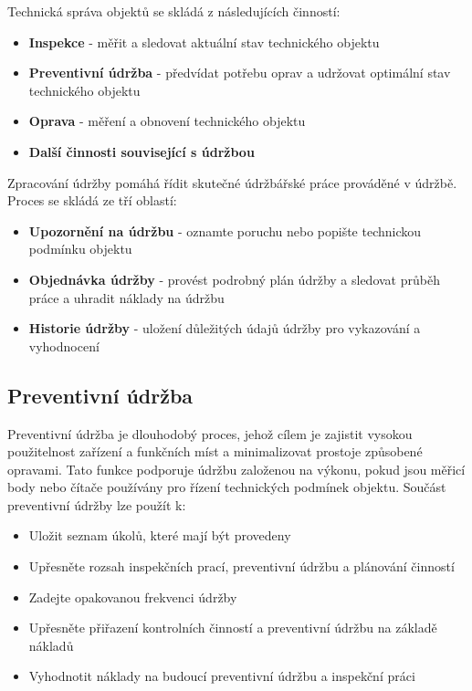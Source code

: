 \documentclass[thesis=M,czech]{FITthesis}[2012/06/26]
\begin{document}
Technická správa objektů se skládá z následujících činností:
\begin{itemize}
	\item
	\textbf{Inspekce} - měřit a sledovat aktuální stav technického objektu
	\item
	\textbf{Preventivní údržba} - předvídat potřebu oprav a udržovat optimální stav technického objektu
	\item
	\textbf{Oprava} - měření a obnovení technického objektu
	\item
	\textbf{Další činnosti související s údržbou}
\end{itemize}
\vspace*{0.5cm}
Zpracování údržby pomáhá řídit skutečné údržbářské práce prováděné v údržbě. Proces se skládá ze tří oblastí:
\begin{itemize}
	\item
	\textbf{Upozornění na údržbu} -  oznamte poruchu nebo popište technickou podmínku objektu
	\item
	\textbf{Objednávka údržby} - provést podrobný plán údržby a sledovat průběh práce a uhradit náklady na údržbu
	\item
	\textbf{Historie údržby} - uložení důležitých údajů údržby pro vykazování a vyhodnocení
\end{itemize} 	

\subsection{Preventivní údržba}
Preventivní údržba je dlouhodobý proces, jehož cílem je zajistit vysokou použitelnost zařízení a funkčních míst a minimalizovat prostoje způsobené opravami. Tato funkce podporuje údržbu založenou na výkonu, pokud jsou měřicí body nebo čítače používány pro řízení technických podmínek objektu.
Součást preventivní údržby lze použít k:
\begin{itemize}
	\item
	Uložit seznam úkolů, které mají být provedeny
	\item
	Upřesněte rozsah inspekčních prací, preventivní údržbu a plánování činností
	\item
	Zadejte opakovanou frekvenci údržby
	\item
	Upřesněte přiřazení kontrolních činností a preventivní údržbu na základě nákladů
	\item
	Vyhodnotit náklady na budoucí preventivní údržbu a inspekční práci
\end{itemize} 	
\end{document}
